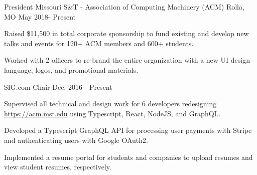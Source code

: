 \begin{cventries}

\cventry
  {President} %
  {Missouri S\&T - Association of Computing Machinery (ACM)} %
  {Rolla, MO} %
  {May 2018- Present} %
  {
    \begin{cvitems} %
      \item {Raised \$11,500 in total corporate sponsorship to fund existing and
             develop new talks and events for 120+ ACM members and 600+ students.}
      \item {Worked with 2 officers to re-brand the entire organization
             with a new UI design language, logos, and promotional materials.}
    \end{cvitems}
  }

\cventry
  {SIG.com Chair} %
  {} %
  {} %
  {Dec. 2016 - Present} %
  {
    \begin{cvitems} %
      \item {Supervised all technical and design work for 6 developers
             redesigning \url{https://acm.mst.edu} using Typescript, React,
             NodeJS, and GraphQL.}
      \item {Developed a Typescript GraphQL API for processing user payments
             with Stripe and authenticating users with Google OAuth2.}
       \item {Implemented a resume portal for students and companies to upload resumes
              and view student resumes, respectively.}
    \end{cvitems}
  }




\end{cventries}
